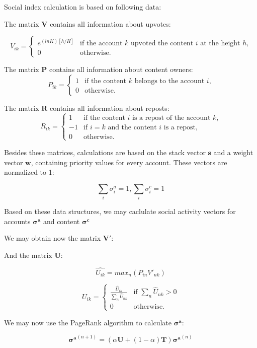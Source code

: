 \documentclass[a4paper,12pt]{article}
\begin{document}
Social index calculation is based on following data:
	
	The matrix $\boldsymbol{V}$ contains all information about upvotes:
	
	$$	
	V_{ik} = \begin{cases}
	 e^{(ln K)[h/H]}
	 & \text{if the account $k$ upvoted the content $i$ at the height $h$,}\\
	 0 & \text{otherwise.}
	\end{cases}
	$$
	
	The matrix $\boldsymbol{P}$ contains all information about content owners:
	$$
	P_{ik} = \begin{cases}
	 1
	 & \text{if the content $k$ belongs to the account $i$,}\\
	 0 & \text{otherwise.}
	\end{cases}
	$$
	
	The matrix $\boldsymbol{R}$ contains all information about reposts:
	$$
	R_{ik} = \begin{cases}
	 1 & \text{if the content $i$ is a repost of the account $k$,}\\
	 -1 & \text{if $i=k$ and the content $i$ is a repost,}\\
	 0 & \text{otherwise.}
	\end{cases}
	$$
	
	
	Besides these matrices, calculations are based on the stack vector $\boldsymbol{s}$ and a weight vector $\boldsymbol{w}$, containing priority values for every account. These vectors are normalized to 1:
	
	$$
	\sum_i{\sigma^a_i} = 1, \sum_i{\sigma^c_i} = 1
	$$
	
	Based on these data structures, we may caclulate social activity vectors for accounts $\boldsymbol{\sigma^a}$ and content $\boldsymbol{\sigma^c}$
	
	We may obtain now the matrix $\boldsymbol{V'}$:
	
	And the matrix $\boldsymbol{U}:$
	
	$$
	\hat{U_{ik}} = max_n(P_{in} V'_{nk})
	$$
	
	$$
	U_{ik} = \begin{cases}
	 \frac{\hat{U}_{ik}} {\sum_n{\hat{U}_{nk}}} & \text{if $\sum_n{\hat{U}_{nk}}>0$} \\
	 0 & \text{otherwise.}
	\end{cases}
	$$
	
	We may now use the PageRank algorithm to calculate $\boldsymbol{\sigma^a}$:
	
	$$
	\boldsymbol{\sigma^a}^{(n+1)} = (\alpha \boldsymbol{U} + (1 - \alpha) \boldsymbol{T})\boldsymbol{\sigma^a}^{(n)}
	$$
	
\end{document}

